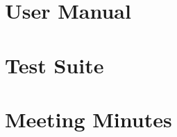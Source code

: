 \documentclass[../report.pdf]{subfiles}
\begin{document}
\section{User Manual}
\section{Test Suite}
\section{Meeting Minutes}
\end{document}
